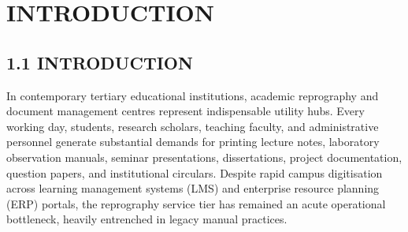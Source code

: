 \documentclass[12pt,a4paper,oneside]{report}
\begin{document}
\clearpage

\tableofcontents
\clearpage
\listoftables
\clearpage
\listoffigures
\clearpage

\clearpage
{}
\setcounter{page}{1}

\chapter{INTRODUCTION}

\section{1.1 INTRODUCTION}
In contemporary tertiary educational institutions, academic reprography and document management centres represent indispensable utility hubs. Every working day, students, research scholars, teaching faculty, and administrative personnel generate substantial demands for printing lecture notes, laboratory observation manuals, seminar presentations, dissertations, project documentation, question papers, and institutional circulars. Despite rapid campus digitisation across learning management systems (LMS) and enterprise resource planning (ERP) portals, the reprography service tier has remained an acute operational bottleneck, heavily entrenched in legacy manual practices.
\end{document}
